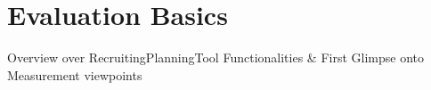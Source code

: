 \chapter{Evaluation Basics}
\label{cha:Evaluation_Basics}

Overview over RecruitingPlanningTool Functionalities & First Glimpse onto Measurement viewpoints